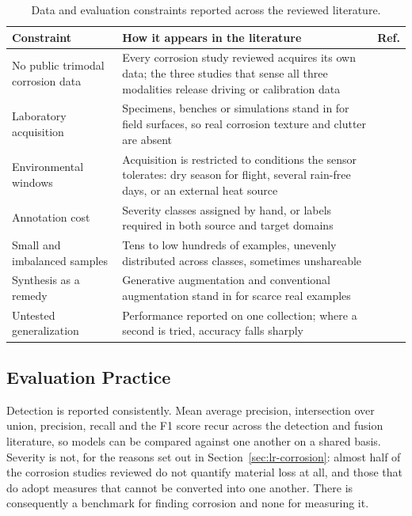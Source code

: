 \begin{table}[htbp]
\centering
\caption{Data and evaluation constraints reported across the reviewed literature.}
\label{tab:data}
\scriptsize
\renewcommand{\arraystretch}{1.15}
\begin{tabularx}{\textwidth}{@{}p{3.2cm} X p{3.4cm}@{}}
\toprule
\textbf{Constraint} & \textbf{How it appears in the literature} & \textbf{Ref.} \\
\midrule
No public trimodal corrosion data & Every corrosion study reviewed acquires its own data; the three studies that sense all three modalities release driving or calibration data & \citep{Tran2025,Yang2024,Tran2024} \\
Laboratory acquisition & Specimens, benches or simulations stand in for field surfaces, so real corrosion texture and clutter are absent & \citep{Maru2025,Asad2026,Phannakham2026,Mirzaei2025,Zhang2026c,Bechis2026} \\
Environmental windows & Acquisition is restricted to conditions the sensor tolerates: dry season for flight, several rain-free days, or an external heat source & \citep{Guedes2025,Yamashita2025,Lim2021} \\
Annotation cost & Severity classes assigned by hand, or labels required in both source and target domains & \citep{Li2024b,Gong2022} \\
Small and imbalanced samples & Tens to low hundreds of examples, unevenly distributed across classes, sometimes unshareable & \citep{Persiya2025,Phannakham2026,Morita2024} \\
Synthesis as a remedy & Generative augmentation and conventional augmentation stand in for scarce real examples & \citep{Li2024b,Sun2022} \\
Untested generalization & Performance reported on one collection; where a second is tried, accuracy falls sharply & \citep{Zhang2026b,Morita2024,Zhang2026c} \\
\bottomrule
\end{tabularx}
\end{table}

\subsection{Evaluation Practice}

Detection is reported consistently. Mean average precision, intersection over
union, precision, recall and the F1 score recur across the detection and fusion
literature, so models can be compared against one another on a shared basis.
Severity is not, for the reasons set out in Section~\ref{sec:lr-corrosion}:
almost half of the corrosion studies reviewed do not quantify material loss at
all, and those that do adopt measures that cannot be converted into one
another. There is
consequently a benchmark for finding corrosion and none for measuring it.

